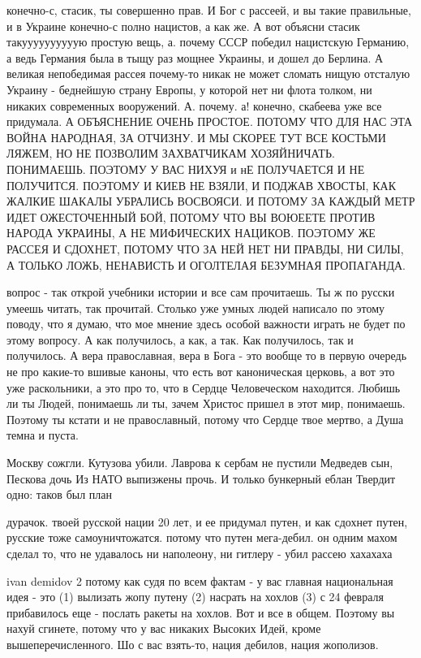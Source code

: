 конечно-с, стасик, ты совершенно прав. И Бог с рассеей, и вы такие правильные,
и в Украине конечно-с полно нацистов, а как же. А вот объясни стасик
такуууууууууую простую вещь, а. почему СССР победил нацистскую Германию, а ведь
Германия была в тыщу раз мощнее Украины, и дошел до Берлина. А великая
непобедимая рассея почему-то никак не может сломать нищую отсталую Украину -
беднейшую страну Европы, у которой нет ни флота толком, ни никаких современных
вооружений. А. почему. а! конечно, скабеева уже все придумала. А ОБЪЯСНЕНИЕ
ОЧЕНЬ ПРОСТОЕ. ПОТОМУ ЧТО ДЛЯ НАС ЭТА ВОЙНА НАРОДНАЯ, ЗА ОТЧИЗНУ. И МЫ СКОРЕЕ
ТУТ ВСЕ КОСТЬМИ ЛЯЖЕМ, НО НЕ ПОЗВОЛИМ ЗАХВАТЧИКАМ ХОЗЯЙНИЧАТЬ. ПОНИМАЕШЬ.
ПОЭТОМУ У ВАС НИХУЯ и нЕ ПОЛУЧАЕТСЯ И НЕ ПОЛУЧИТСЯ. ПОЭТОМУ И КИЕВ НЕ ВЗЯЛИ, И
ПОДЖАВ ХВОСТЫ, КАК ЖАЛКИЕ ШАКАЛЫ УБРАЛИСЬ ВОСВОЯСИ. И ПОТОМУ ЗА КАЖДЫЙ МЕТР
ИДЕТ ОЖЕСТОЧЕННЫЙ БОЙ, ПОТОМУ ЧТО ВЫ ВОЮЕЕТЕ ПРОТИВ НАРОДА УКРАИНЫ, А НЕ
МИФИЧЕСКИХ НАЦИКОВ. ПОЭТОМУ ЖЕ РАССЕЯ И СДОХНЕТ, ПОТОМУ ЧТО ЗА НЕЙ НЕТ НИ
ПРАВДЫ, НИ СИЛЫ, А ТОЛЬКО ЛОЖЬ, НЕНАВИСТЬ И ОГОЛТЕЛАЯ БЕЗУМНАЯ ПРОПАГАНДА.

вопрос - так открой учебники истории и все сам прочитаешь. Ты ж по русски
умеешь читать, так прочитай. Столько уже умных людей написало по этому поводу,
что я думаю, что мое мнение здесь особой важности играть не будет по этому
вопросу. А как получилось, а как, а так. Как получилось, так и получилось. А
вера православная, вера в Бога - это вообще то в первую очередь не про какие-то
вшивые каноны, что есть вот каноническая церковь, а вот это уже раскольники, а
это про то, что в Сердце Человеческом находится. Любишь ли ты Людей, понимаешь
ли ты, зачем Христос пришел в этот мир, понимаешь. Поэтому ты кстати и не
православный, потому что Сердце твое мертво, а Душа темна и пуста.

Москву сожгли.
Кутузова убили.
Лаврова к сербам не пустили
Медведев сын,
Пескова дочь
Из НАТО выпизжены прочь.
И только бункерный еблан
Твердит одно: таков был план

дурачок. твоей русской нации 20 лет, и ее придумал путен, и как сдохнет путен,
русские тоже самоуничтожатся. потому что путен мега-дебил. он одним махом
сделал то, что не удавалось ни наполеону, ни гитлеру - убил рассею хахахаха

ivan demidov 2 потому как судя по всем фактам - у вас главная национальная идея
- это (1) вылизать жопу путену (2) насрать на хохлов (3) с 24 февраля
прибавилось еще - послать ракеты на хохлов. Вот и все в общем. Поэтому вы нахуй
сгинете, потому что у вас никаких Высоких Идей, кроме вышеперечисленного. Шо с
вас взять-то, нация дебилов, нация жополизов.

